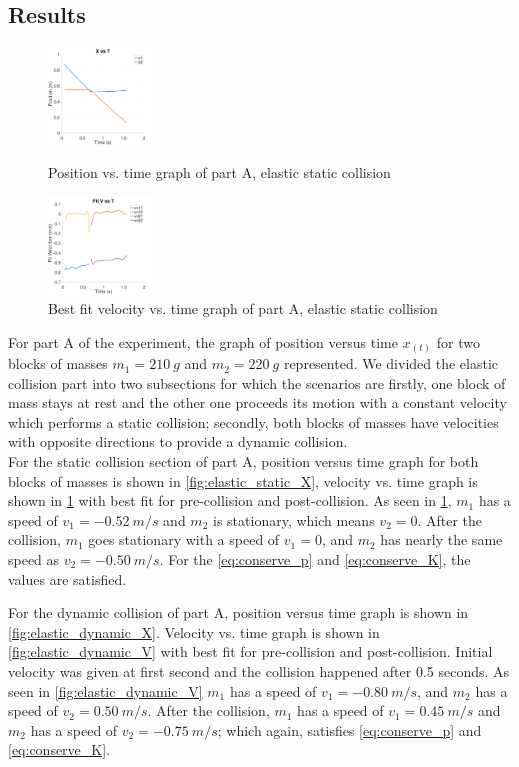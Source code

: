 \documentclass[a4paper, 12pt]{article}
\newcommand{\subhead}[1]{\subsection{\normalsize #1}}
\begin{document}
    \subhead{Results}
    \begin{figure}
        \includegraphics[width=0.25\textwidth]{./elastic_static_X.png}
        \caption{Position vs. time graph of part A, elastic static collision}
        \label{fig:elastic_static_X}

        \includegraphics[width=0.25\textwidth]{./elastic_static_Vfit.png}
        \caption{Best fit velocity vs. time graph of part A, elastic static collision}
        \label{fig:elastic_static_V}
    \end{figure}
    For part A of the experiment, the graph of position versus time $x_{(t)}$ for two blocks of masses
    $m_1 = 210~g$ and $m_2 = 220~g$ represented. We divided the elastic collision part into two subsections
    for which the scenarios are firstly, one block of mass stays at rest and the other one proceeds its 
    motion with a constant velocity which performs a static collision; secondly, both blocks of
    masses have velocities with opposite directions to provide a dynamic collision. \\
    For the static collision section of part A, position versus time graph for both blocks of masses
    is shown in \cref{fig:elastic_static_X}, velocity vs. time graph is shown in \cref{fig:elastic_static_V}
    with best fit for pre-collision and post-collision. As seen in \cref{fig:elastic_static_V}, $m_1$ has a
    speed of $v_1 = -0.52~m/s$ and $m_2$ is stationary, which means $v_2 = 0$. After the collision, $m_1$ goes
    stationary with a speed of $v_1 = 0$, and $m_2$ has nearly the same speed as $v_2=-0.50~m/s$. For the
    \cref{eq:conserve_p} and \cref{eq:conserve_K}, the values are satisfied.

    For the dynamic collision of part A, position versus time graph is shown in \cref{fig:elastic_dynamic_X}.
    Velocity vs. time graph is shown in \cref{fig:elastic_dynamic_V} with best fit for pre-collision and
    post-collision. Initial velocity was given at first second and the collision happened after 0.5 seconds.
    As seen in \cref{fig:elastic_dynamic_V} $m_1$ has a speed of $v_1 = -0.80~m/s$, and $m_2$ has a speed of
    $v_2 = 0.50~m/s$. After the collision, $m_1$ has a speed of $v_1 = 0.45~m/s$ and $m_2$ has a speed of
    $v_2 = -0.75~m/s$; which again, satisfies \cref{eq:conserve_p} and \cref{eq:conserve_K}.
\end{document}

